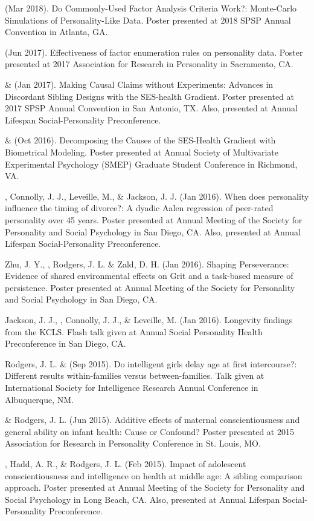 \item\meb (Mar 2018). Do Commonly-Used Factor Analysis Criteria Work?: Monte-Carlo Simulations of Personality-Like Data. Poster presented at 2018 SPSP Annual Convention in Atlanta, GA. 
\item\meb (Jun 2017). Effectiveness of factor enumeration rules on personality data. Poster presented at 2017 Association for Research in Personality in Sacramento, CA.
%
\item\meb \& \joe (Jan 2017). Making Causal Claims without Experiments: Advances in Discordant Sibling Designs with the SES-health Gradient. Poster presented at 2017 SPSP Annual Convention in San Antonio, TX. Also, presented at Annual Lifespan Social-Personality Preconference.
%
\item\meb \& \joe (Oct 2016). Decomposing the Causes of the SES-Health Gradient with Biometrical Modeling. Poster presented at Annual Society of Multivariate Experimental Psychology (SMEP) Graduate Student Conference in Richmond, VA.
%
\item \meb, Connolly, J. J., Leveille, M., \& Jackson, J. J. (Jan 2016). When does personality influence the timing of divorce?: A dyadic Aalen regression of peer-rated personality over 45 years. Poster presented at Annual Meeting of the Society for Personality and Social Psychology in San Diego, CA. Also, presented at Annual Lifespan Social-Personality Preconference.
%
\item Zhu, J. Y., \meb, Rodgers, J. L. \& Zald, D. H. (Jan 2016). Shaping Perseverance: Evidence of shared environmental effects on Grit and a task-based measure of persistence. Poster presented at Annual Meeting of the Society for Personality and Social Psychology in San Diego, CA.
\item Jackson, J. J., \meb, Connolly, J. J., \& Leveille, M. (Jan 2016). Longevity findings from the KCLS. Flash talk given at Annual Social Personality Health Preconference in San Diego, CA. %
%
\item Rodgers, J. L. \& \meb (Sep 2015). Do intelligent girls delay age at first intercourse?: Different results within-families versus between-families. Talk given at International Society for Intelligence Research Annual Conference in Albuquerque, NM.
%
\item \meb \& Rodgers, J. L. (Jun 2015). Additive effects of maternal conscientiousness and general ability on infant health: Cause or Confound? Poster presented at 2015 Association for Research in Personality Conference in St. Louis, MO.%
\item \meb, Hadd, A. R., \& Rodgers, J. L. (Feb 2015). Impact of adolescent conscientiousness and intelligence on health at middle age: A sibling comparison approach. Poster presented at Annual Meeting of the Society for Personality and Social Psychology in Long Beach, CA. Also, presented at Annual Lifespan Social-Personality Preconference.

